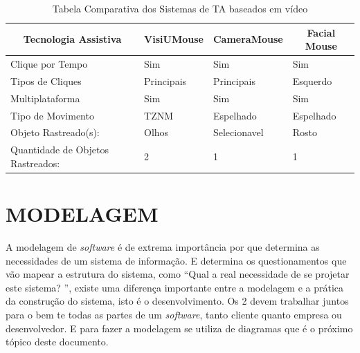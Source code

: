\begin{table}[tbp]
\centering
\caption{Tabela Comparativa dos Sistemas de TA baseados em vídeo}
\label{tabela-comparativa}
\begin{tabular}{|l|l|l|l|}
\hline
\multicolumn{1}{|c|}{\textbf{Tecnologia Assistiva}} & \multicolumn{1}{c|}{\textbf{VisiUMouse}} & \multicolumn{1}{c|}{\textbf{CameraMouse}} & \multicolumn{1}{c|}{\textbf{Facial Mouse}} \\ \hline
Clique por Tempo                                     & \cellcolor[HTML]{67FD9A}Sim              & \cellcolor[HTML]{67FD9A}Sim                & \cellcolor[HTML]{67FD9A}Sim                \\ \hline
Tipos  de Cliques                                    & Principais                               & Principais                                 & Esquerdo                                   \\ \hline
Multiplataforma                                     & \cellcolor[HTML]{67FD9A}Sim              & \cellcolor[HTML]{67FD9A}Sim                & \cellcolor[HTML]{67FD9A}Sim                \\ \hline
Tipo de Movimento                                   & TZNM                                     & Espelhado                                  & Espelhado                                  \\ \hline
Objeto Rastreado(s):                                & Olhos                                    & Selecionavel                               & Rosto                                      \\ \hline
Quantidade de Objetos Rastreados:                   & 2                                        & 1                                          & 1                                          \\ \hline
\end{tabular}
\end{table}

\chapter{MODELAGEM}\label{CAP5}
A modelagem de \textit{software} é de extrema importância por que determina as necessidades de um sistema de informação. E determina os questionamentos que vão mapear a estrutura do sistema, como “Qual a real necessidade de se projetar este sistema? ”, existe uma diferença importante entre a modelagem e a prática da construção do sistema, isto é o desenvolvimento. Os 2 devem trabalhar juntos para o bem te todas as partes de um \textit{software}, tanto cliente quanto empresa ou desenvolvedor. E para fazer a modelagem se utiliza de diagramas que é o próximo tópico deste documento.

